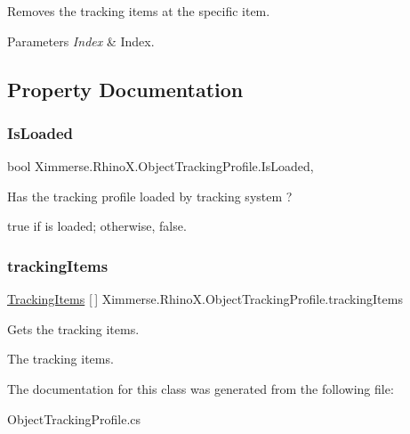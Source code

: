 Removes the tracking items at the specific item. 


\begin{DoxyParams}{Parameters}
{\em Index} & Index.\\
\hline
\end{DoxyParams}


\subsection{Property Documentation}
\mbox{\label{class_ximmerse_1_1_rhino_x_1_1_object_tracking_profile_a3749a2ba2e7a79434c61475897b8d664}} 
\subsubsection{\texorpdfstring{Is\+Loaded}{IsLoaded}}
{\footnotesize\ttfamily bool Ximmerse.\+Rhino\+X.\+Object\+Tracking\+Profile.\+Is\+Loaded\hspace{0.3cm}{\ttfamily [get]}, {\ttfamily [set]}}



Has the tracking profile loaded by tracking system ? 

{\ttfamily true} if is loaded; otherwise, {\ttfamily false}.\mbox{\label{class_ximmerse_1_1_rhino_x_1_1_object_tracking_profile_ad9d2e13ef6fdf8e901f7ee53cf42a7d3}} 
\subsubsection{\texorpdfstring{tracking\+Items}{trackingItems}}
{\footnotesize\ttfamily \mbox{\hyperlink{class_ximmerse_1_1_rhino_x_1_1_object_tracking_profile_1_1_tracking_items}{Tracking\+Items}} \mbox{[}$\,$\mbox{]} Ximmerse.\+Rhino\+X.\+Object\+Tracking\+Profile.\+tracking\+Items\hspace{0.3cm}{\ttfamily [get]}}



Gets the tracking items. 

The tracking items.

The documentation for this class was generated from the following file\+:\begin{DoxyCompactItemize}
\item 
Object\+Tracking\+Profile.\+cs\end{DoxyCompactItemize}

